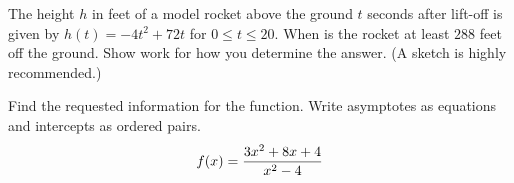 \documentclass[11pt,addpoints,answers]{exam}
\begin{document}
\begin{questions}
\question[20] The height $h$ in feet of a model rocket above the ground $t$ seconds after lift-off is given by $h(t)=-4t^2+72t$ for $0\leq t\leq 20$.  When is the rocket at least $288$ feet off the ground.  Show work for how you determine the answer.  (A sketch is highly recommended.)


\vspace*{1.5in}

\begin{flushright}

\end{flushright}



  \vfill
\pagestyle{empty}

\newpage

\setlength\columnsep{1cm}

\question Find the requested information for the function. Write asymptotes as equations and intercepts as ordered pairs.
$$ f(x)= \dfrac{3x^2+8x+4}{x^2-4}\\$$
\vspace{.1cm}
\begin{multicols}{2}

\end{multicols}
\end{questions}
\end{document}
